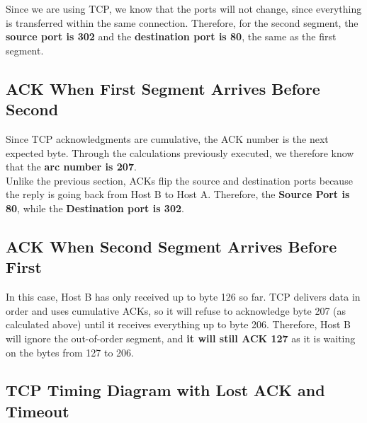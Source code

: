 \documentclass{article}
\begin{document}
Since we are using TCP, we know that the ports will not change, since everything is transferred within the same connection. Therefore, for the second segment, the \textbf{source port is 302} and the \textbf{destination port is 80}, the same as the first segment.
\subsection{ACK When First Segment Arrives Before Second}
Since TCP acknowledgments are cumulative, the ACK number is the next expected byte. Through the calculations previously executed, we therefore know that the \textbf{ arc number is 207}. \\

Unlike the previous section, ACKs flip the source and destination ports because the reply is going back from Host B to Host A. Therefore, the \textbf{Source Port is 80}, while the \textbf{Destination port is 302}.
\subsection{ACK When Second Segment Arrives Before First}
In this case, Host B has only received up to byte 126 so far. TCP delivers data in order and uses cumulative ACKs, so it will refuse to acknowledge byte 207 (as calculated above) until it receives everything up to byte 206. Therefore, Host B will ignore the out-of-order segment, and \textbf{it will still ACK 127} as it is waiting on the bytes from 127 to 206.
\subsection{TCP Timing Diagram with Lost ACK and Timeout}
\\
\end{document}
